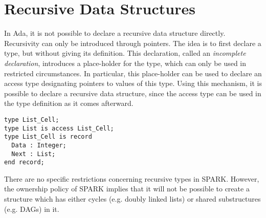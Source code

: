 \documentclass[runningheads]{llncs}
\begin{document}
\section{Recursive Data Structures}
In Ada, it is not possible to declare a recursive data structure directly. Recursivity can only be introduced through pointers. The idea is to first declare a type, but without giving its definition. This declaration, called an \emph{incomplete declaration}, introduces a place-holder for the type, which can only be used in restricted circumstances. In particular, this place-holder can be used to declare an access type designating pointers to values of this type. %
Using this mechanism, it is possible to declare a recursive data structure, since the access type can be used in the type definition as it comes afterward.
\begin{lstlisting}
type List_Cell;
type List is access List_Cell;
type List_Cell is record
  Data : Integer;
  Next : List;
end record;
\end{lstlisting}
There are no specific restrictions concerning recursive types in SPARK. However, the ownership policy of SPARK implies that it will not be possible to create a structure which has either cycles (e.g. doubly linked lists) or shared substructures (e.g. DAGs) in it.
\end{document}
